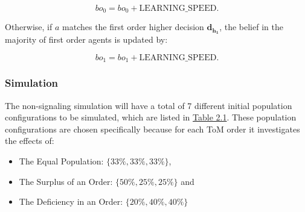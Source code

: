 \[
b{o_0} = b{o_0} + \text{{LEARNING\_SPEED}}.
\]

Otherwise, if $a$ matches the first order higher decision $\mathbf{d_{h_1}}$, the belief in the majority of first order agents is updated by:

\[
    b{o_1} = b{o_1} + \text{{LEARNING\_SPEED}}.
\]

\subsubsection{Simulation}

The non-signaling simulation will have a total of 7 different initial population configurations to be simulated, which are listed in \hyperref[tab:reg-population-table]{Table 2.1}. These population configurations are chosen specifically because for each ToM order it investigates the effects of:
\begin{itemize}
    \item The Equal Population: $\{33\%,33\%,33\%\}$,
    \item The Surplus of an Order: $\{50\%,25\%,25\%\}$ and 
    \item The Deficiency in an Order: $\{20\%,40\%,40\%\}$
\end{itemize}


